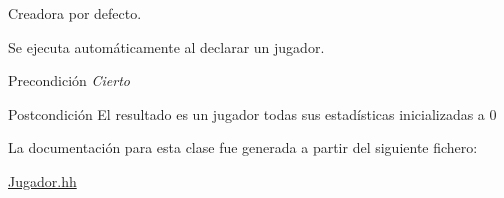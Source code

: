 Creadora por defecto. 

Se ejecuta automáticamente al declarar un jugador. \begin{DoxyPrecond}{Precondición}
{\itshape Cierto} 
\end{DoxyPrecond}
\begin{DoxyPostcond}{Postcondición}
El resultado es un jugador todas sus estadísticas inicializadas a 0 
\end{DoxyPostcond}


La documentación para esta clase fue generada a partir del siguiente fichero\+:\begin{DoxyCompactItemize}
\item 
\hyperlink{_jugador_8hh}{Jugador.\+hh}\end{DoxyCompactItemize}
